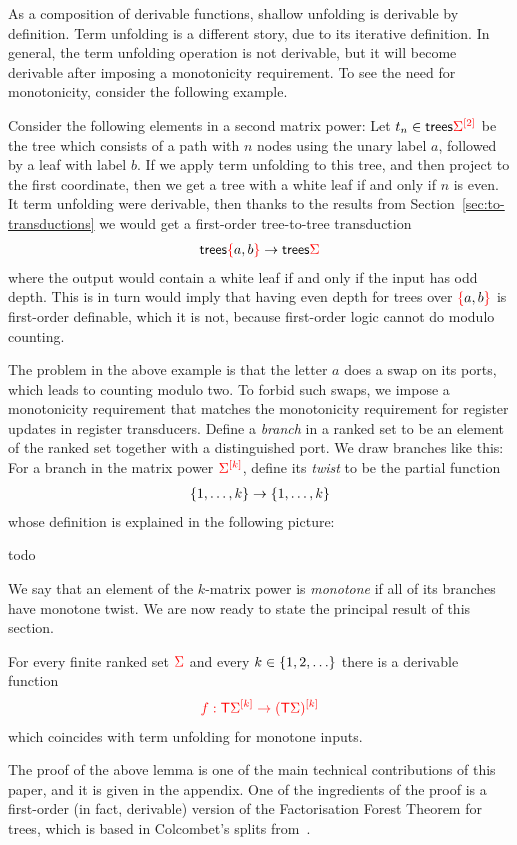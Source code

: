 As a composition of derivable functions, shallow unfolding is derivable by definition.  Term unfolding is a different story, due to its iterative definition. 
In general, the term unfolding operation is not derivable, but it will become derivable after imposing a monotonicity requirement.   To see the need for monotonicity, consider the following example.
\begin{example}
    Consider the following elements in a second matrix power:
Let $t_n \in \trees \mati 2 \rSigma$ be the tree which consists of a path with $n$ nodes using the unary label $a$, followed by a leaf with label $b$. If we apply term unfolding to this tree, and then project to the first coordinate, then we get a tree with a white leaf if and only if  $n$ is even.  It term   unfolding were derivable, then thanks to the results from Section~\ref{sec:to-transductions}  we would get a first-order tree-to-tree transduction 
\begin{align*}
\trees \redset{a,b} \to \trees \rSigma
\end{align*}
where the output would contain a white leaf if and only if the input has odd depth. This is in turn would imply that having even depth for trees over $\redset{a,b}$ is first-order definable, which it is not, because first-order logic cannot do modulo counting.
\end{example}

The problem in the above example is that the letter $a$ does a swap on its ports, which leads to counting modulo two. To forbid such swaps, we impose a monotonicity requirement that matches the monotonicity requirement for register updates in register transducers. 
Define a \emph{branch} in a ranked set to be an element  of the ranked set together with a distinguished port. We draw branches like  this:
For a branch in the matrix power   $\mati k \rSigma$, define its \emph{twist} to be the partial function 
\begin{align*}
 \set{1,\ldots,k} \to \set{1,\ldots,k}
\end{align*}
whose definition is explained in the following picture:
\begin{center}
    todo
\end{center}
 We say that an element of the $k$-matrix power is \emph{monotone} if all of its branches have monotone twist.
 We are now ready to state the principal result of this section.

\begin{lemma}\label{lem:monotone-unfold}
    For every finite ranked set $\rSigma$ and every $k \in \set{1,2,\ldots}$ there is a derivable function 
    \begin{align*}
    \ranked{ f : \tmonad \mati k \Sigma \to \mati k {(\tmonad \Sigma)}}
    \end{align*}
    which coincides with term unfolding for monotone inputs.
\end{lemma}
The proof of the  above lemma is one of the main technical contributions of this paper, and it is given in the appendix. One of the ingredients of the proof is a first-order (in fact, derivable) version of the Factorisation Forest Theorem for trees, which is based in Colcombet's splits from~\cite{colcombetCombinatorialTheoremTrees2007}.  

